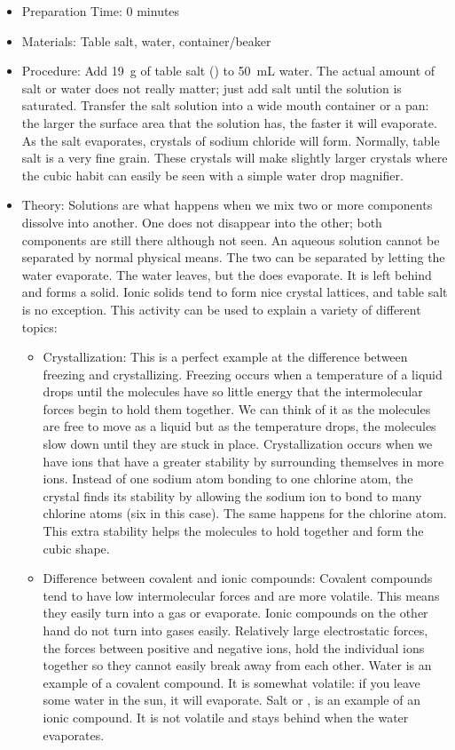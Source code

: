 \begin{itemize}
\item{Preparation Time: 0 minutes}
\item{Materials: Table salt, water, container/beaker}
\item{Procedure: Add 19~g of table salt () to 50~mL water. The actual amount of salt or water does not really matter; just add salt until the solution is saturated. Transfer the salt solution into a wide mouth container or a pan: the larger the surface area that the solution has, the faster it will evaporate. As the salt evaporates, crystals of sodium chloride will form. Normally, table salt is a very fine grain. These crystals will make slightly larger crystals where the cubic habit can easily be seen with a simple water drop magnifier.}

\item{Theory: Solutions are what happens when we mix two or more components dissolve into another. One does not disappear into the other; both components are still there although not seen. An aqueous solution cannot be separated by normal physical means. The two can be separated by letting the water evaporate. The water leaves, but the  does evaporate. It is left behind and forms a solid. Ionic solids tend to form nice crystal lattices, and table salt is no exception. This activity can be used to explain a variety of different topics:}

\begin{itemize}
\item{Crystallization: This is a perfect example at the difference between freezing and crystallizing. Freezing occurs when a temperature of a liquid drops until the molecules have so little energy that the intermolecular forces begin to hold them together. We can think of it as the molecules are free to move as a liquid but as the temperature drops, the molecules slow down until they are stuck in place. Crystallization occurs when we have ions that have a greater stability by surrounding themselves in more ions. Instead of one sodium atom bonding to one chlorine atom, the crystal finds its stability by allowing the sodium ion to bond to many chlorine atoms (six in this case). The same happens for the chlorine atom. This extra stability helps the molecules to hold together and form the cubic shape.}
\item{Difference between covalent and ionic compounds: Covalent compounds tend to have low intermolecular forces and are more volatile. This means they easily turn into a gas or evaporate. Ionic compounds on the other hand do not turn into gases easily. Relatively large electrostatic forces, the forces between positive and negative ions, hold the individual ions together so they cannot easily break away from each other. Water is an example of a covalent compound. It is somewhat volatile: if you leave some water in the sun, it will evaporate. Salt or , is an example of an ionic compound. It is not volatile and stays behind when the water evaporates.}
\end{itemize}
\end{itemize}

